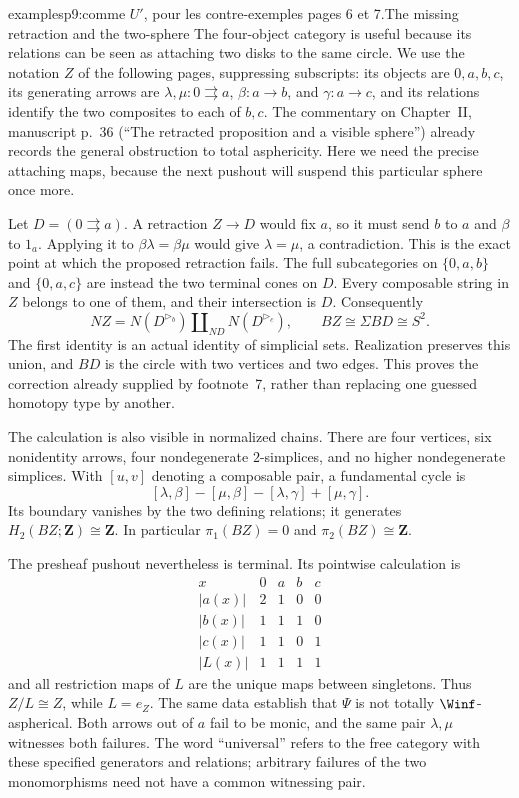 \begin{dcomment}{examples}{p9:comme $U'$, pour les contre-exemples pages 6 et 7.}{The missing retraction and the two-sphere}
The four-object category is useful because its relations can be seen as attaching two disks to the same circle. We use the notation $Z$ of the following pages, suppressing subscripts: its objects are $0,a,b,c$, its generating arrows are $\lambda,\mu:0\rightrightarrows a$, $\beta:a\to b$, and $\gamma:a\to c$, and its relations identify the two composites to each of $b,c$. The commentary on Chapter~II, manuscript p.~36 (``The retracted proposition and a visible sphere'') already records the general obstruction to total asphericity. Here we need the precise attaching maps, because the next pushout will suspend this particular sphere once more.

Let $D=(0\rightrightarrows a)$. A retraction $Z\to D$ would fix $a$, so it must send $b$ to $a$ and $\beta$ to $1_a$. Applying it to $\beta\lambda=\beta\mu$ would give $\lambda=\mu$, a contradiction. This is the exact point at which the proposed retraction fails. The full subcategories on $\{0,a,b\}$ and $\{0,a,c\}$ are instead the two terminal cones on $D$. Every composable string in $Z$ belongs to one of them, and their intersection is $D$. Consequently
\[
 NZ=N(D^{\triangleright_b})\amalg_{ND}N(D^{\triangleright_c}),
 \qquad BZ\cong\Sigma BD\cong S^2.
\]
The first identity is an actual identity of simplicial sets. Realization preserves this union, and $BD$ is the circle with two vertices and two edges. This proves the correction already supplied by footnote~7, rather than replacing one guessed homotopy type by another.

The calculation is also visible in normalized chains. There are four vertices, six nonidentity arrows, four nondegenerate $2$-simplices, and no higher nondegenerate simplices. With $[u,v]$ denoting a composable pair, a fundamental cycle is
\[
 [\lambda,\beta]-[\mu,\beta]-[\lambda,\gamma]+[\mu,\gamma].
\]
Its boundary vanishes by the two defining relations; it generates $H_2(BZ;\mathbf Z)\cong\mathbf Z$. In particular $\pi_1(BZ)=0$ and $\pi_2(BZ)\cong\mathbf Z$.

The presheaf pushout nevertheless is terminal. Its pointwise calculation is
\[
\begin{array}{c|cccc}
 x&0&a&b&c\\\hline
 |a(x)|&2&1&0&0\\
 |b(x)|&1&1&1&0\\
 |c(x)|&1&1&0&1\\
 |L(x)|&1&1&1&1
\end{array}
\]
and all restriction maps of $L$ are the unique maps between singletons. Thus $Z/L\cong Z$, while $L=e_Z$. The same data establish that $\Psi$ is not totally $\Winf$-aspherical. Both arrows out of $a$ fail to be monic, and the same pair $\lambda,\mu$ witnesses both failures. The word ``universal'' refers to the free category with these specified generators and relations; arbitrary failures of the two monomorphisms need not have a common witnessing pair.
\end{dcomment}

